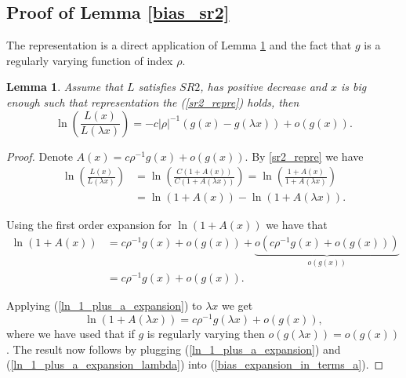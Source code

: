 \documentclass[sn-mathphys-ay]{sn-jnl}%
\newtheorem{lemma}{Lemma}[section]
\begin{document}
\begin{appendices}
\subsection{Proof of Lemma \ref{bias_sr2}}

The representation is a direct application of Lemma \ref{ln_ratio} and the fact that
\(g\) is a regularly varying function of index \(\rho\).

\begin{lemma}\label{ln_ratio} Assume that \(L\) satisfies \(SR2\), has
    positive decrease and \(x\) is big enough such that representation the (\ref{sr2_repre}) holds, then
    \begin{equation}
        \ln\left(\frac{L(x)}{L(\lambda x)}\right) = -c|\rho|^{-1}\left( g(x)-g(\lambda x) \right) + o\left(g(x)\right).
    \end{equation}
\end{lemma}
\begin{proof}
    Denote \(A(x) = c\rho^{-1}g(x)+o\left(g \left(x\right) \right)\). By
    \eqref{sr2_repre} we have
    \begin{align}
        \ln\left(\frac{L(x)}{L(\lambda x)}\right) & = \ln\left( \frac{C(1+A(x))}{C(1+A(\lambda x))} \right) = \ln\left( \frac{1+A(x)}{1+A(\lambda x)} \right)\nonumber \\
                                                  & = \ln{\left(1+A\left(x\right)\right)}-\ln(1+A(\lambda x)).\label{bias_expansion_in_terms_a}
    \end{align}

    Using the first order expansion for \(\ln(1+A(x))\) we have that
    \begin{align}
        \ln\left(1+A\left(x\right)\right) & =c\rho^{-1}g(x)+o\left(g\left(x\right)\right)+\underbrace{o\left(c\rho^{-1}g(x)+o\left(g\left(x\right)\right)\right)}_{o\left(g\left(x\right)\right)}\nonumber \\
                                          & =c\rho^{-1}g(x)+o\left(g\left(x\right)\right).\label{ln_1_plus_a_expansion}
    \end{align}

    Applying (\ref{ln_1_plus_a_expansion}) to \(\lambda x\) we get
    \begin{equation}
        \ln\left(1+A\left(\lambda x\right)\right) = c\rho^{-1}g(\lambda x)+o\left(g\left(x\right)\right),\label{ln_1_plus_a_expansion_lambda}
    \end{equation}
    where we have used that if \(g\) is regularly varying then
    \(o\left(g\left(\lambda x\right)\right)=o\left(g\left(x\right)\right)\). The
    result now follows by plugging (\ref{ln_1_plus_a_expansion}) and
    (\ref{ln_1_plus_a_expansion_lambda}) into (\ref{bias_expansion_in_terms_a}).
\end{proof}


\end{appendices}
\end{document}
